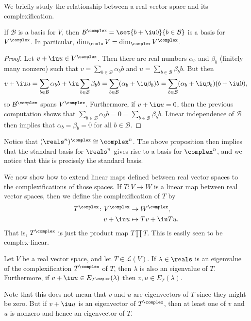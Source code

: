 \documentclass[a4paper, 11pt]{memoir}
\theoremstyle{plaincustomnumber}
\theoremstyle{changedotbreakcustomnumber}
\newcommand{\calL}{\mathcal{L}}
\newcommand{\calB}{\mathcal{B}}
\begin{document}
\newpar

We briefly study the relationship between a real vector space and its complexification.

\begin{proposition}
    If $\calB$ is a basis for $V$, then $\calB^\complex = \set{b + \iu 0}{b \in \calB}$ is a basis for $V^\complex$. In particular, $\dim_\reals V = \dim_\complex V^\complex$.
\end{proposition}

\begin{proof}
    Let $v + \iu u \in V^\complex$. Then there are real numbers $\alpha_b$ and $\beta_b$ (finitely many nonzero) such that $v = \sum_{b \in \calB} \alpha_b b$ and $u = \sum_{b \in \calB} \beta_b b$. But then
    \begin{equation*}
        v + \iu u
            = \sum_{b \in \calB} \alpha_b b
                + \iu \sum_{b \in \calB} \beta_b b
            = \sum_{b \in \calB} (\alpha_b + \iu \beta_b) b
            = \sum_{b \in \calB} (\alpha_b + \iu \beta_b) (b + \iu 0),
    \end{equation*}
    so $\calB^\complex$ spans $V^\complex$. Furthermore, if $v + \iu u = 0$, then the previous computation shows that $\sum_{b \in \calB} \alpha_b b = 0 = \sum_{b \in \calB} \beta_b b$. Linear independence of $\calB$ then implies that $\alpha_b = \beta_b = 0$ for all $b \in \calB$.
\end{proof}

\begin{example}
    Notice that $(\reals^n)^\complex \cong \complex^n$. The above proposition then implies that the standard basis for $\reals^n$ gives rise to a basis for $\complex^n$, and we notice that this is precisely the standard basis.
\end{example}


\newpar

We now show how to extend linear maps defined between real vector spaces to the complexifications of those spaces. If $T \colon V \to W$ is a linear map between real vector spaces, then we define the complexification of $T$ by
%
\begin{align*}
    T^\complex \colon V^\complex &\to W^\complex, \\
    v + \iu u &\mapsto Tv + \iu Tu.
\end{align*}
%
That is, $T^\complex$ is just the product map $T \prod T$. This is easily seen to be complex-linear.

\begin{proposition}
    \label{prop:complexification-eigenvalue}
    Let $V$ be a real vector space, and let $T \in \calL(V)$. If $\lambda \in \reals$ is an eigenvalue of the complexification $T^\complex$ of $T$, then $\lambda$ is also an eigenvalue of $T$. Furthermore, if $v + \iu u \in E_{T^\complex}(\lambda)$ then $v,u \in E_T(\lambda)$.
\end{proposition}
%
Note that this does not mean that $v$ and $u$ are eigenvectors of $T$ since they might be zero. But if $v + \iu u$ is an eigenvector of $T^\complex$, then at least one of $v$ and $u$ is nonzero and hence an eigenvector of $T$.
\end{document}
